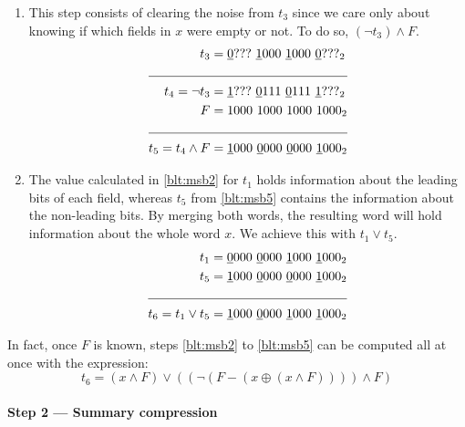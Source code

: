\begin{enumerate}
    \item \label{blt:msb5}
    This step consists of clearing the noise from $t_3$ since we care only about knowing if which fields in $x$ were empty or not. To do so, $(\neg t_3) \wedge F$.
    \begin{align*}
                       t_3 &= \underline{0}???\ \underline{1}000\ \underline{1}000\ \underline{0}???_2 \\ \cline{1-2} 
            t_4 = \neg t_3 &= \underline{1}???\ \underline{0}111\ \underline{0}111\ \underline{1}???_2 \\
                         F &= 1000\ 1000\ 1000\ 1000_2 \\ \cline{1-2} 
        t_5 = t_4 \wedge F &= \underline{1}000\ \underline{0}000\ \underline{0}000\ \underline{1}000_2
    \end{align*}
    
    \item \label{blt:msb6}
    The value calculated in \ref{blt:msb2} for $t_1$ holds information about the leading bits of each field, whereas $t_5$ from \ref{blt:msb5} contains the information about the non-leading bits. By merging both words, the resulting word will hold information about the whole word $x$. We achieve this with $t_1 \vee t_5$.
    \begin{align*}
                       t_1 &= \underline{0}000\ \underline{0}000\ \underline{1}000\ \underline{1}000_2 \\
                       t_5 &= \underline{1}000\ \underline{0}000\ \underline{0}000\ \underline{1}000_2 \\ \cline{1-2} 
        t_6 = t_1 \vee t_5 &= \underline{1}000\ \underline{0}000\ \underline{1}000\ \underline{1}000_2
    \end{align*}
\end{enumerate}

In fact, once $F$ is known, steps \ref{blt:msb2} to \ref{blt:msb5} can be computed all at once with the expression:
\begin{equation}
    t_6 = (x \wedge F) \vee ((\neg(F - (x \oplus(x \wedge F)))) \wedge F)
\end{equation}

\paragraph{Step 2 --- Summary compression} \label{sec:summaryCompression}

